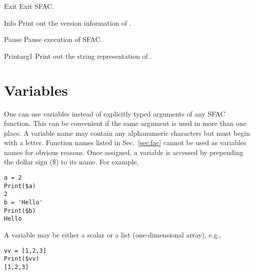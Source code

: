 \begin{fundesc}{Exit}{}
Exit SFAC.
\end{fundesc}

\begin{fundesc}{Info}{}
Print out the version information of \cFAC.
\end{fundesc}

\begin{fundesc}{Pause}{}
Pause execution of SFAC.
\end{fundesc}

\begin{fundesc}{Print}{arg1}
Print out the string representation of .
\end{fundesc}


\section{Variables}
One can use variables instead of explicitly typed arguments of any SFAC
function. This can be convenient if the same argument is used in more than one
place. A variable name may contain any alphanumeric characters but must begin
with a letter. Function names listed in Sec.~\ref{sec:fac} cannot be used as
variables names for obvious reasons. Once assigned, a variable is accessed by
prepending the dollar sign (\$) to its name. For example,
\begin{verbatim}
a = 2
Print($a)
2
b = 'Hello'
Print($b)
Hello
\end{verbatim}
A variable may be either a scalar or a list (one-dimensional array), e.g.,
\begin{verbatim}
vv = [1,2,3]
Print($vv)
[1,2,3]
\end{verbatim}
